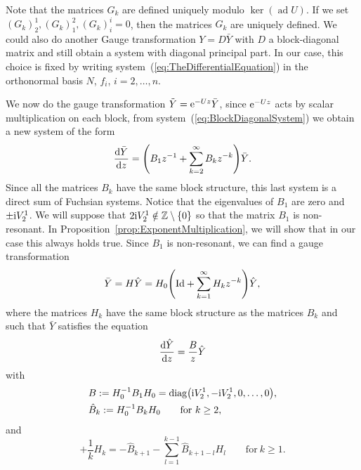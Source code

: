 \documentclass[pdftex]{sigma}
\numberwithin{equation}{section}
\begin{document}
 \begin{Remark}
 Note that the matrices $G_{k}$ are defined uniquely modulo $\operatorname{ker} ({\operatorname{ad}U})$.
 If we set $(G_{k})^{1}_{2},(G_{k})^{2}_{1},(G_{k})^{i}_{i}=0$, then the matrices $G_{k}$ are uniquely defined. We could also do another Gauge transformation $Y=D\bar{Y}$ with $D$ a block-diagonal matrix and still obtain a system with diagonal principal part. In our case, this choice is fixed by writing system~(\ref{eq:TheDifferentialEquation}) in the orthonormal basis $N$, $f_{i}$, $i=2,\dots,n$.
 \end{Remark}
 We now do the gauge transformation $\tilde{Y}={\rm e}^{-Uz}\bar{Y}$, since ${\rm e}^{-Uz}$ acts by scalar multiplication on each block, from system~(\ref{eq:BlockDiagonalSystem}) we obtain a new system of the form
 \begin{equation}
 \label{eq:IntermidateSystem}
 \frac{{\rm d}\bar{Y}}{{\rm d}z}=\Biggl( B_{1}z^{-1}+\sum_{k=2}^{\infty}B_{k}z^{-k}\Biggr)\bar{Y}.
 \end{equation}
 Since all the matrices $B_{k}$ have the same block structure, this last system is a direct sum of Fuchsian systems. Notice that the eigenvalues of $B_{1}$ are zero and $\pm {\rm i}V^{1}_{2}$. We will suppose that $2{\rm i} V^{1}_{2}\notin\mathbb{Z}\setminus \{ 0 \}$ so that the matrix $B_{1}$ is non-resonant. In Proposition~\ref{prop:ExponentMultiplication}, we will show that in our case this always holds true. Since $B_{1}$ is non-resonant, we can find a gauge transformation
\begin{equation*}
 \bar{Y}=H\hat{Y}=H_{0}\Biggl({\rm Id}+\sum_{k=1}^{\infty}H_{k}z^{-k}\Biggr)\hat{Y},
 \end{equation*}
 where the matrices $H_{k}$ have the same block structure as the matrices $B_{k}$ and such that $\bar{Y}$ satisfies the equation
 \begin{equation*}
 \frac{{\rm d}\hat{Y}}{{\rm d}z}=\frac{B}{z}\hat{Y}
 \end{equation*}
 with
 \begin{align*}
 & B:=H_{0}^{-1}B_{1}H_{0}=\operatorname{diag}\bigl({\rm i}V^{1}_{2},-{\rm i}V^{1}_{2},0,\dots,0\bigr),\\
 & \hat{B}_{k}:=H_{0}^{-1}B_{k}H_{0}\qquad \mathrm{for}\ k\geq2,
 \end{align*}
 and
 \begin{equation*}
 [B,H_{k}]+\frac{1}{k}H_{k}=-\hat{B}_{k+1}-\sum_{l=1}^{k-1}\hat{B}_{k+1-l}H_{l} \qquad \mathrm{for}\ k\geq 1.
 \end{equation*}
\end{document}
